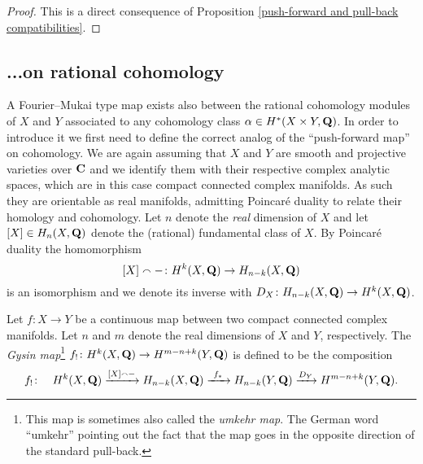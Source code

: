 \begin{proof}
    This is a direct consequence of Proposition \ref{push-forward and pull-back compatibilities}.
\end{proof}

\subsection{...on rational cohomology}
\label{Subsection: FM transform on cohomology}

A Fourier--Mukai type map exists also between the rational cohomology modules of $X$ and $Y$ associated to any cohomology class $\alpha \in H^{*}(X \times Y, \mathbf Q)$. In order to introduce it we first need to define the correct analog of the ``push-forward map'' on cohomology. We are again assuming that $X$ and $Y$ are smooth and projective varieties over $\mathbf C$ and we identify them with their respective complex analytic spaces, which are in this case compact connected complex manifolds. As such they are orientable as real manifolds, admitting Poincaré duality to relate their homology and cohomology. Let $n$ denote the \emph{real} dimension of $X$ and let $[X] \in H_n(X, \mathbf Q)$ denote the (rational) fundamental class of $X$. By Poincaré duality \cite[\S VI, Theorem 8.3]{Bredon1993} the homomorphism
\[
    [X] \smallfrown - \colon H^{k}(X, \mathbf Q) \to H_{n-k}(X, \mathbf Q)
\]
is an isomorphism and we denote its inverse with $D_X \colon H_{n-k}(X, \mathbf Q) \to H^{k}(X, \mathbf Q)$.

\begin{definition}
    \label{Definition of umkehr map}
    Let $f \colon X \to Y$ be a continuous map between two compact connected complex manifolds. Let $n$ and $m$ denote the real dimensions of $X$ and $Y$, respectively.
    The \emph{Gysin map}\footnote{This map is sometimes also called the \emph{umkehr map}. The German word ``umkehr'' pointing out the fact that the map goes in the opposite direction of the standard pull-back.} $f_! \colon H^{k}(X, \mathbf Q) \to H^{m-n+k}(Y, \mathbf Q)$ is defined to be the composition
    \[
        f_! \colon \quad H^{k}(X, \mathbf Q) \xrightarrow{[X] \smallfrown -} H_{n-k}(X, \mathbf Q) \xrightarrow{\ f_* \ } H_{n-k}(Y, \mathbf Q) \xrightarrow{D_Y} H^{m-n+k}(Y, \mathbf Q).
    \]
\end{definition}

